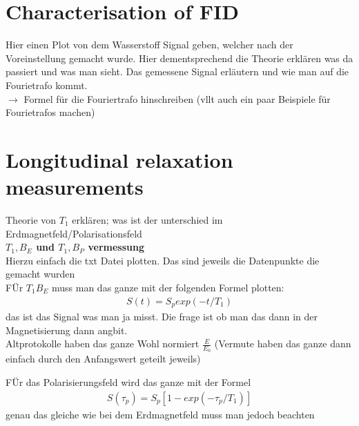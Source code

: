 \section{Characterisation of FID}
    Hier einen Plot von dem Wasserstoff Signal geben, welcher nach der Voreinstellung gemacht wurde. Hier dementsprechend die Theorie erklären was da passiert und was man sieht. Das gemessene Signal erläutern und wie man auf die Fourietrafo kommt.\\
    $\rightarrow$ Formel für die Fouriertrafo hinschreiben (vllt auch ein paar Beispiele für Fourietrafos machen)

\section{Longitudinal relaxation measurements}
    Theorie von $T_1$ erklären; was ist der unterschied im Erdmagnetfeld/Polarisationsfeld\\
    \textbf{$T_1,B_E$ und $T_1,B_P$ vermessung}\\
    Hierzu einfach die txt Datei plotten. Das sind jeweils die Datenpunkte die gemacht wurden\\
    FÜr $T_1B_E$ muss man das ganze mit der folgenden Formel plotten:
    \begin{align}
        S(t)= S_p exp(-t/T_1)
    \end{align}
    das ist das Signal was man ja misst. Die frage ist ob man das dann in der Magnetisierung dann angbit.\\
    Altprotokolle haben das ganze Wohl normiert $\frac{E}{E_0}$ (Vermute haben das ganze dann einfach durch den Anfangswert geteilt jeweils)\\
    \newline

    FÜr das Polarisierungsfeld wird das ganze mit der Formel 
    \begin{align}
        S(\tau_p)=S_p[1-exp(-\tau_p/T_1)]
    \end{align}
    genau das gleiche wie bei dem Erdmagnetfeld muss man jedoch beachten

